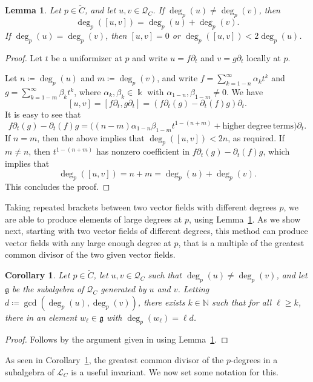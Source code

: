 \documentclass[12pt]{amsart}
\theoremstyle{plain}
\newtheorem{lemma}[theorem]{Lemma}
\newtheorem{corollary}[theorem]{Corollary}
\theoremstyle{definition}
\numberwithin{equation}{section}
\def\g{\mathfrak{g}}
\def\L{\mathcal{L}}
\def\Q{\mathcal{Q}}
\def\NN{\mathbb{N}}
\def\kk{\Bbbk}
\def\del{\partial}
\begin{document}
\begin{lemma}\label{lem:degrees form a semigroup}
    Let $p \in \widetilde{C}$, and let $u,v \in \Q_C$. If $\deg_p(u) \neq \deg_p(v)$, then
    $$\deg_p([u,v]) = \deg_p(u) + \deg_p(v).$$
    If $\deg_p(u) = \deg_p(v)$, then $[u,v] = 0$ or $\deg_p([u,v]) < 2\deg_p(u)$.
\end{lemma}
\begin{proof}
    Let $t$ be a uniformizer at $p$ and write $u = f\del_t$ and $v = g\del_t$ locally at $p$.
    
    Let $n \coloneqq \deg_p(u)$ and $m \coloneqq \deg_p(v)$, and write $f = \sum_{k = 1 - n}^\infty \alpha_k t^k$ and $g = \sum_{k = 1 - m}^\infty \beta_k t^k$, where $\alpha_k, \beta_k \in \kk$ with $\alpha_{1 - n}, \beta_{1 - m} \neq 0$. We have
    $$[u,v] = [f\del_t, g\del_t] = (f\del_t(g) - \del_t(f)g)\del_t.$$
    It is easy to see that
    $$f\del_t(g) - \del_t(f)g = \Big((n - m)\alpha_{1 - n} \beta_{1 - m} t^{1 - (n + m)} + \mathrm{higher~degree~terms}\Big)\del_t.$$
    If $n = m$, then the above implies that $\deg_p([u,v]) < 2n$, as required. If $m \neq n$, then $t^{1 - (n + m)}$ has nonzero coefficient in $f\del_t(g) - \del_t(f)g$, which implies that
    $$\deg_p([u,v]) = n + m = \deg_p(u) + \deg_p(v).$$
    This concludes the proof.
\end{proof}

Taking repeated brackets between two vector fields with different degrees $p$, we are able to produce elements of large degrees at $p$, using Lemma~\ref{lem:degrees form a semigroup}. As we show next, starting with two vector fields of different degrees, this method can produce vector fields with any large enough degree at $p$, that is a multiple of the greatest common divisor of the two given vector fields.

\begin{corollary}\label{cor:gcd of degrees}
    Let $p \in \widetilde{C}$, let $u,v \in \Q_C$ such that $\deg_p(u) \neq \deg_p(v)$, and let $\g$ be the subalgebra of $\Q_C$ generated by $u$ and $v$. Letting $d \coloneqq \gcd(\deg_p(u),\deg_p(v))$, there exists $k \in \NN$ such that for all $\ell \geq k$, there in an element $w_\ell \in \g$ with $\deg_p(w_\ell) = \ell d$.
\end{corollary}
\begin{proof}
    Follows by the argument given in \cite[Lemma 4.7]{Buzaglo} using Lemma~\ref{lem:degrees form a semigroup}.
\end{proof}

As seen in Corollary~\ref{cor:gcd of degrees}, the greatest common divisor of the $p$-degrees in a subalgebra of $\L_C$ is a useful invariant. We now set some notation for this.
\end{document}
